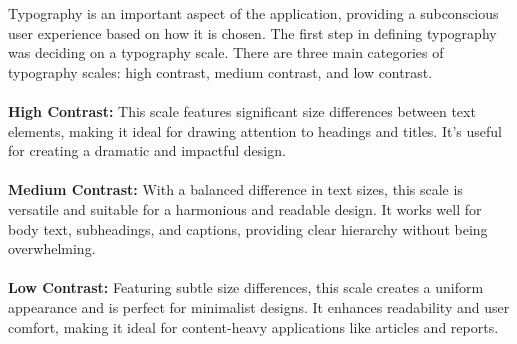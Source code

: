 \noindent Typography is an important aspect of the application, providing a subconscious user experience based on how it is chosen. The first step in defining typography was deciding on a typography scale. There are three main categories of typography scales: high contrast, medium contrast, and low contrast.
\\\\
\textbf{High Contrast:} This scale features significant size differences between text elements, making it ideal for drawing attention to headings and titles. It's useful for creating a dramatic and impactful design.
\\\\
\textbf{Medium Contrast:} With a balanced difference in text sizes, this scale is versatile and suitable for a harmonious and readable design. It works well for body text, subheadings, and captions, providing clear hierarchy without being overwhelming.
\\\\
\textbf{Low Contrast:} Featuring subtle size differences, this scale creates a uniform appearance and is perfect for minimalist designs. It enhances readability and user comfort, making it ideal for content-heavy applications like articles and reports.

